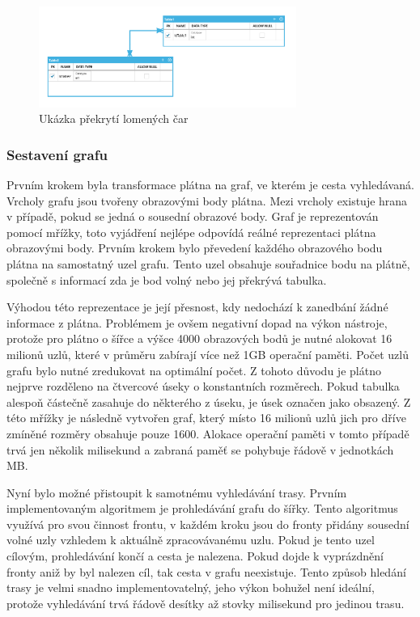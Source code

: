 \documentclass[czech,bachelor,public,dept460,male,oneside]{diploma}
\begin{document}
	\begin{figure}[!h]
		\centering
		\includegraphics[width=0.75\textwidth]{Figures/ScreenLineOverSelf}
		\caption{Ukázka překrytí lomených čar}
		\label{fig:screenLinesOverlay}
	\end{figure}
	
	\subsubsection{Sestavení grafu}
	Prvním krokem byla transformace plátna na graf, ve kterém je cesta vyhledávaná. Vrcholy grafu jsou tvořeny obrazovými body plátna. Mezi vrcholy existuje hrana v případě, pokud se jedná o sousední obrazové body. Graf je reprezentován pomocí mřížky, toto vyjádření nejlépe odpovídá reálné reprezentaci plátna obrazovými body. Prvním krokem bylo převedení každého obrazového bodu plátna na samostatný uzel grafu. Tento uzel obsahuje souřadnice bodu na plátně, společně s informací zda je bod volný nebo jej překrývá tabulka.
	
	Výhodou této reprezentace je její přesnost, kdy nedochází k zanedbání žádné informace z plátna. Problémem je ovšem negativní dopad na výkon nástroje, protože pro plátno o šířce a výšce 4000 obrazových bodů je nutné alokovat 16 milionů uzlů, které v průměru zabírají více než 1GB operační paměti. Počet uzlů grafu bylo nutné zredukovat na optimální počet. Z tohoto důvodu je plátno nejprve rozděleno na čtvercové úseky o konstantních rozměrech. Pokud tabulka alespoň částečně zasahuje do některého z úseku, je úsek označen jako obsazený. Z této mřížky je následně vytvořen graf, který místo 16 milionů uzlů jich pro dříve zmíněné rozměry obsahuje pouze 1600. Alokace operační paměti v tomto případě trvá jen několik milisekund a zabraná paměť se pohybuje řádově v jednotkách MB.
	
	Nyní bylo možné přistoupit k samotnému vyhledávání trasy. Prvním implementovaným algoritmem je prohledávání grafu do šířky. Tento algoritmus využívá pro svou činnost frontu, v každém kroku jsou do fronty přidány sousední volné uzly vzhledem k aktuálně zpracovávanému uzlu. Pokud je tento uzel cílovým, prohledávání končí a cesta je nalezena. Pokud dojde k vyprázdnění fronty aniž by byl nalezen cíl, tak cesta v grafu neexistuje. Tento způsob hledání trasy je velmi snadno implementovatelný, jeho výkon bohužel není ideální, protože vyhledávání trvá řádově desítky až stovky milisekund pro jedinou trasu.
	
\end{document}
